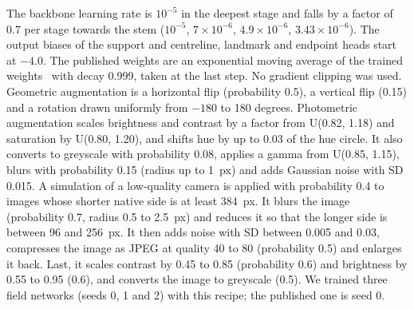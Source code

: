 The backbone learning rate is $10^{-5}$ in the deepest stage and falls by a factor of 0.7 per stage towards the stem ($10^{-5}$, $7 \times 10^{-6}$, $4.9 \times 10^{-6}$, $3.43 \times 10^{-6}$).
The output biases of the support and centreline, landmark and endpoint heads start at $-4.0$.
The published weights are an exponential moving average of the trained weights~\cite{polyak1992acceleration} with decay 0.999, taken at the last step.
No gradient clipping was used.
Geometric augmentation is a horizontal flip (probability 0.5), a vertical flip (0.15) and a rotation drawn uniformly from $-180$ to 180 degrees.
Photometric augmentation scales brightness and contrast by a factor from U(0.82, 1.18) and saturation by U(0.80, 1.20), and shifts hue by up to 0.03 of the hue circle.
It also converts to greyscale with probability 0.08, applies a gamma from U(0.85, 1.15), blurs with probability 0.15 (radius up to 1~px) and adds Gaussian noise with SD 0.015.
A simulation of a low-quality camera is applied with probability 0.4 to images whose shorter native side is at least 384~px.
It blurs the image (probability 0.7, radius 0.5 to 2.5~px) and reduces it so that the longer side is between 96 and 256~px.
It then adds noise with SD between 0.005 and 0.03, compresses the image as JPEG at quality 40 to 80 (probability 0.5) and enlarges it back.
Last, it scales contrast by 0.45 to 0.85 (probability 0.6) and brightness by 0.55 to 0.95 (0.6), and converts the image to greyscale (0.5).
We trained three field networks (seeds 0, 1 and 2) with this recipe; the published one is seed 0.

